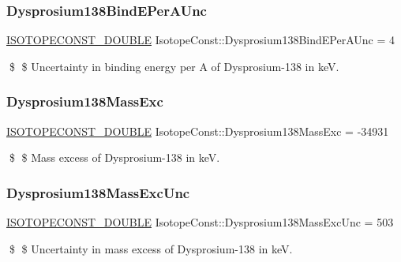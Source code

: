 \subsubsection{\texorpdfstring{Dysprosium138\+Bind\+E\+Per\+A\+Unc}{Dysprosium138BindEPerAUnc}}
{\footnotesize\ttfamily \mbox{\hyperlink{group___isotope_const-_macros_ga8f45a7272ce02c0b4c65c44636ed719a}{I\+S\+O\+T\+O\+P\+E\+C\+O\+N\+S\+T\+\_\+\+D\+O\+U\+B\+LE}} Isotope\+Const\+::\+Dysprosium138\+Bind\+E\+Per\+A\+Unc = 4}

\$ \$ Uncertainty in binding energy per A of Dysprosium-\/138 in keV. \mbox{\label{group___isotope_const-_dysprosium-_dy138_ga953be84d8e91aec5168e8d6adc4e9366}} 
\subsubsection{\texorpdfstring{Dysprosium138\+Mass\+Exc}{Dysprosium138MassExc}}
{\footnotesize\ttfamily \mbox{\hyperlink{group___isotope_const-_macros_ga8f45a7272ce02c0b4c65c44636ed719a}{I\+S\+O\+T\+O\+P\+E\+C\+O\+N\+S\+T\+\_\+\+D\+O\+U\+B\+LE}} Isotope\+Const\+::\+Dysprosium138\+Mass\+Exc = -\/34931}

\$ \$ Mass excess of Dysprosium-\/138 in keV. \mbox{\label{group___isotope_const-_dysprosium-_dy138_ga61c9ac43bd65ae468960302330a8570a}} 
\subsubsection{\texorpdfstring{Dysprosium138\+Mass\+Exc\+Unc}{Dysprosium138MassExcUnc}}
{\footnotesize\ttfamily \mbox{\hyperlink{group___isotope_const-_macros_ga8f45a7272ce02c0b4c65c44636ed719a}{I\+S\+O\+T\+O\+P\+E\+C\+O\+N\+S\+T\+\_\+\+D\+O\+U\+B\+LE}} Isotope\+Const\+::\+Dysprosium138\+Mass\+Exc\+Unc = 503}

\$ \$ Uncertainty in mass excess of Dysprosium-\/138 in keV. \mbox{\label{group___isotope_const-_dysprosium-_dy138_gaa6166ffa79489672ec58533996443605}} 
